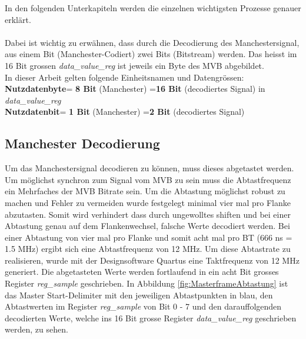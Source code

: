 In den folgenden Unterkapiteln werden die einzelnen wichtigsten Prozesse genauer erklärt.\\
\\
Dabei ist wichtig zu erwähnen, dass durch die Decodierung des Manchestersignal, aus einem Bit
(Manchester-Codiert) zwei Bits (Bitstream) werden. Das heisst im 16 Bit grossen 
\textit{data\_value\_reg} ist jeweils ein Byte des MVB abgebildet.\\
\newline
In dieser Arbeit gelten folgende Einheitsnamen und Datengrössen:\\
\textbf{Nutzdatenbyte}\hspace{0.1cm}= \textbf{8 Bit} (Manchester) =\hspace{0.1cm}\textbf{16 Bit} (decodiertes Signal) in \textit{data\_value\_reg}\\
\textbf{Nutzdatenbit}\hspace{0.37cm}= \textbf{1 Bit} (Manchester) =\hspace{0.3cm}\textbf{2  Bit} (decodiertes Signal)
\newpage
\subsection{Manchester Decodierung}
\label{Manchester Decodierung}

Um das Manchestersignal decodieren zu können, muss dieses abgetastet werden. Um möglichst synchron zum
Signal vom MVB zu sein muss die Abtastfrequenz ein Mehrfaches der MVB Bitrate sein. Um die Abtastung möglichst
robust zu machen und Fehler zu vermeiden wurde festgelegt minimal vier mal pro Flanke abzutasten. Somit
wird verhindert dass durch ungewolltes shiften und bei einer Abtastung genau auf dem Flankenwechsel, falsche Werte
decodiert werden.
Bei einer Abtastung von vier mal pro Flanke und somit acht mal pro BT (666 ns = 1.5 MHz) ergibt sich eine Abtastfrequenz von 12 MHz.
Um diese Abtastrate zu realisieren, wurde mit der Designsoftware Quartus eine Taktfrequenz von 12 MHz generiert.
Die abgetasteten Werte werden fortlaufend in ein acht Bit grosses Register \textit{reg\_sample} geschrieben.
In Abbildung \ref{fig:MasterframeAbtastung} ist das Master Start-Delimiter mit den
jeweiligen Abtastpunkten in blau, den Abtastwerten im Register \textit{reg\_sample} von Bit 0 - 7 und den darauffolgenden decodierten 
Werte, welche ins 16 Bit grosse Register \textit{data\_value\_reg} geschrieben werden, zu sehen.

